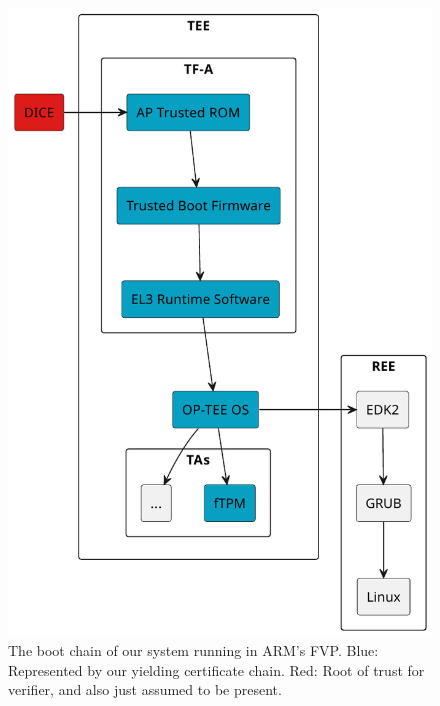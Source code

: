 \begin{figure}[htpb]
  \centering
  \includegraphics[width=0.8\linewidth]{figures/boot-chain.pdf}
  \caption{The boot chain of our system running in ARM's FVP\@. Blue: Represented by our yielding certificate chain. Red: Root of trust for verifier, and also just assumed to be present.}\label{fig:boot_chain}
\end{figure}
